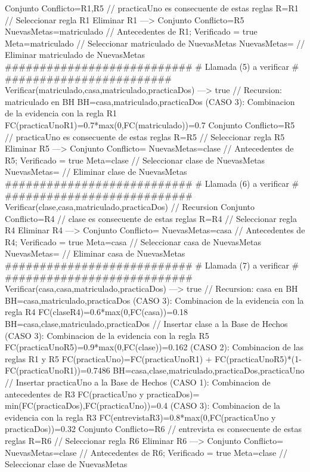 \begin{listing}[language=Pascal]
	Conjunto Conflicto={R1,R5} // practicaUno es consecuente de estas reglas
	R={R1} // Seleccionar regla R1
	Eliminar R1 ---> Conjunto Conflicto={R5}
	NuevasMetas={matriculado} // Antecedentes de R1; Verificado = true
	Meta=matriculado // Seleccionar matriculado de NuevasMetas
	NuevasMetas={} // Eliminar matriculado de NuevasMetas
  ###########################
  # Llamada (5) a verificar #
  ########################
	Verificar(matriculado,{casa,matriculado,practicaDos}) ---> true // Recursion: matriculado en BH
	BH={casa,matriculado,practicaDos}
	(CASO 3): Combinacion de la evidencia con la regla R1
	 FC(practicaUno{R1})=0.7*max(0,FC(matriculado))=0.7
	Conjunto Conflicto={R5} // practicaUno es consecuente de estas reglas
	R={R5} // Seleccionar regla R5
	Eliminar R5 ---> Conjunto Conflicto={}
	NuevasMetas={clase} // Antecedentes de R5; Verificado = true
	Meta=clase // Seleccionar clase de NuevasMetas
	NuevasMetas={} // Eliminar clase de NuevasMetas
  ###########################
  # Llamada (6) a verificar #
  ###########################
	Verificar(clase,{casa,matriculado,practicaDos}) // Recursion 
	Conjunto Conflicto={R4} // clase es consecuente de estas reglas
	R={R4} // Seleccionar regla R4
	Eliminar R4 ---> Conjunto Conflicto={}
	NuevasMetas={casa} // Antecedentes de R4; Verificado = true
	Meta=casa // Seleccionar casa de NuevasMetas
	NuevasMetas={} // Eliminar casa de NuevasMetas
  ###########################
  # Llamada (7) a verificar #
  ###########################
	Verificar(casa,{casa,matriculado,practicaDos}) ---> true // Recursion: casa en BH
	BH={casa,matriculado,practicaDos}
	(CASO 3): Combinacion de la evidencia con la regla R4
	 FC(clase{R4})=0.6*max(0,FC(casa))=0.18
	BH={casa,clase,matriculado,practicaDos} // Insertar clase a la Base de Hechos
	(CASO 3): Combinacion de la evidencia con la regla R5
	 FC(practicaUno{R5})=0.9*max(0,FC(clase))=0.162
	(CASO 2): Combinacion de las reglas R1 y R5
	 FC(practicaUno)=FC(practicaUno{R1}) + FC(practicaUno{R5})*(1-FC(practicaUno{R1}))=0.7486
	BH={casa,clase,matriculado,practicaDos,practicaUno} // Insertar practicaUno a la Base de Hechos
	(CASO 1): Combinacion de antecedentes de R3
	 FC(practicaUno y practicaDos)= min(FC(practicaDos),FC(practicaUno))=0.4
	(CASO 3): Combinacion de la evidencia con la regla R3
	 FC(entrevista{R3})=0.8*max(0,FC(practicaUno y practicaDos))=0.32
	Conjunto Conflicto={R6} // entrevista es consecuente de estas reglas
	R={R6} // Seleccionar regla R6
	Eliminar R6 ---> Conjunto Conflicto={}
	NuevasMetas={clase} // Antecedentes de R6; Verificado = true
	Meta=clase // Seleccionar clase de NuevasMetas

\end{listing}
